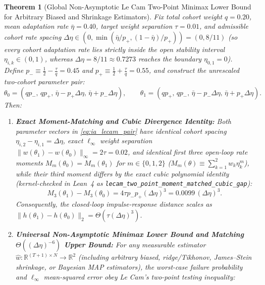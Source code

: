 \documentclass[12pt]{article}
\newtheorem{theorem}{Theorem}[section]
\theoremstyle{definition}
\theoremstyle{remark}
\begin{document}
\begin{theorem}[Global Non-Asymptotic Le Cam Two-Point Minimax Lower Bound for Arbitrary Biased and Shrinkage Estimators]
\label{thm:ia_minimax_lecam}
Fix total cohort weight $q = 0.20$, mean adaptation rate $\bar{\eta} = 0.40$, target weight separation $\tau = 0.01$, and admissible cohort rate spacing $\Delta\eta \in (0, \min(\bar{\eta}/p_+, (1-\bar{\eta})/p_+)) = (0, 8/11)$ (so every cohort adaptation rate lies strictly inside the open stability interval $\eta_{i,k} \in (0, 1)$, whereas $\Delta\eta = 8/11 \approx 0.7273$ reaches the boundary $\eta_{0,1} = 0$). Define $p_- \equiv \frac{1}{2} - \frac{\tau}{q} = 0.45$ and $p_+ \equiv \frac{1}{2} + \frac{\tau}{q} = 0.55$, and construct the unrescaled two-cohort parameter pair:
\begin{equation}
\theta_0 = (q p_-,\, q p_+,\, \bar{\eta} - p_+ \Delta\eta,\, \bar{\eta} + p_- \Delta\eta), \qquad \theta_1 = (q p_+,\, q p_-,\, \bar{\eta} - p_- \Delta\eta,\, \bar{\eta} + p_+ \Delta\eta).
\label{eq:ia_lecam_pair}
\end{equation}
Then:
\begin{enumerate}
\item \textbf{Exact Moment-Matching and Cubic Divergence Identity:} Both parameter vectors in \eqref{eq:ia_lecam_pair} have identical cohort spacing $\eta_{i,2} - \eta_{i,1} = \Delta\eta$, exact $\ell_\infty$ weight separation $\|w(\theta_1) - w(\theta_0)\|_\infty = 2\tau = 0.02$, and identical first three open-loop rate moments $M_m(\theta_0) = M_m(\theta_1)$ for $m \in \{0, 1, 2\}$ ($M_m(\theta) \equiv \sum_{k=1}^2 w_k \eta_k^m$), while their third moment differs by the exact cubic polynomial identity (kernel-checked in Lean~4 as \nolinkurl{lecam_two_point_moment_matched_cubic_gap}):
\begin{equation}
M_3(\theta_1) - M_3(\theta_0) = 4 \tau p_- p_+ (\Delta\eta)^3 = 0.0099 \, (\Delta\eta)^3.
\end{equation}
Consequently, the closed-loop impulse-response distance scales as $\|h(\theta_1) - h(\theta_0)\|_2 = \Theta(\tau (\Delta\eta)^3)$.
\item \textbf{Universal Non-Asymptotic Minimax Lower Bound and Matching $\Theta((\Delta\eta)^{-6})$ Upper Bound:} For any measurable estimator $\hat{w} : \mathbb{R}^{(T+1) \times N} \to \mathbb{R}^2$ (including arbitrary biased, ridge/Tikhonov, James--Stein shrinkage, or Bayesian MAP estimators), the worst-case failure probability and $\ell_\infty$ mean-squared error obey Le Cam's two-point testing inequality:
\begin{equation}

\end{equation}
\end{enumerate}
\end{theorem}
\end{document}
